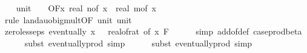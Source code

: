 \begin{isabellebody}
\isanewline
\ \ \isamarkupfalse%
\ unit{\isacharunderscore}{\kern0pt}{}{\isacharcolon}{\kern0pt}\ {\isachardoublequoteopen}{\isacharparenleft}{\kern0pt}{\isasymlambda}{\isacharunderscore}{\kern0pt}{\isachardot}{\kern0pt}\ {}{\isacharparenright}{\kern0pt}\ {\isasymin}\ O{\isacharbrackleft}{\kern0pt}{\isacharquery}{\kern0pt}F{\isacharbrackright}{\kern0pt}{\isacharparenleft}{\kern0pt}{\isasymlambda}x{\isachardot}{\kern0pt}\ real\ {\isacharparenleft}{\kern0pt}n{\isacharunderscore}{\kern0pt}of\ x{\isacharparenright}{\kern0pt}\ {\isacharasterisk}{\kern0pt}\ real\ {\isacharparenleft}{\kern0pt}m{\isacharunderscore}{\kern0pt}of\ x{\isacharparenright}{\kern0pt}{\isacharparenright}{\kern0pt}{\isachardoublequoteclose}\isanewline
\ \ \ \ \isamarkupfalse%
\ {\isacharparenleft}{\kern0pt}rule\ landau{\isacharunderscore}{\kern0pt}o{\isachardot}{\kern0pt}big{\isacharunderscore}{\kern0pt}mult{\isacharunderscore}{\kern0pt}{}{\isacharprime}{\kern0pt}{\isacharbrackleft}{\kern0pt}OF\ unit{\isacharunderscore}{\kern0pt}{}\ unit{\isacharunderscore}{\kern0pt}{}{\isacharbrackright}{\kern0pt}{\isacharparenright}{\kern0pt}\isanewline
\isanewline
\ \ \isamarkupfalse%
\ zero{\isacharunderscore}{\kern0pt}less{\isacharunderscore}{\kern0pt}eps{\isacharcolon}{\kern0pt}\ {\isachardoublequoteopen}eventually\ {\isacharparenleft}{\kern0pt}{\isasymlambda}x{\isachardot}{\kern0pt}\ {}\ {\isacharless}{\kern0pt}\ {\isacharparenleft}{\kern0pt}real{\isacharunderscore}{\kern0pt}of{\isacharunderscore}{\kern0pt}rat\ {\isacharparenleft}{\kern0pt}{\isasymepsilon}{\isacharunderscore}{\kern0pt}of\ x{\isacharparenright}{\kern0pt}{\isacharparenright}{\kern0pt}{\isacharparenright}{\kern0pt}\ {\isacharquery}{\kern0pt}F{\isachardoublequoteclose}\isanewline
\ \ \ \ \isamarkupfalse%
\ {\isacharparenleft}{\kern0pt}simp\ add{\isacharcolon}{\kern0pt}{\isasymepsilon}{\isacharunderscore}{\kern0pt}of{\isacharunderscore}{\kern0pt}def\ case{\isacharunderscore}{\kern0pt}prod{\isacharunderscore}{\kern0pt}beta{\isacharprime}{\kern0pt}{\isacharparenright}{\kern0pt}\isanewline
\ \ \ \ \isamarkupfalse%
\ {\isacharparenleft}{\kern0pt}subst\ eventually{\isacharunderscore}{\kern0pt}prod{}{\isacharprime}{\kern0pt}{\isacharcomma}{\kern0pt}\ simp{\isacharparenright}{\kern0pt}\isanewline
\ \ \ \ \isamarkupfalse%
\ {\isacharparenleft}{\kern0pt}subst\ eventually{\isacharunderscore}{\kern0pt}prod{}{\isacharprime}{\kern0pt}{\isacharcomma}{\kern0pt}\ simp{\isacharparenright}{\kern0pt}\isanewline

\end{isabellebody}
